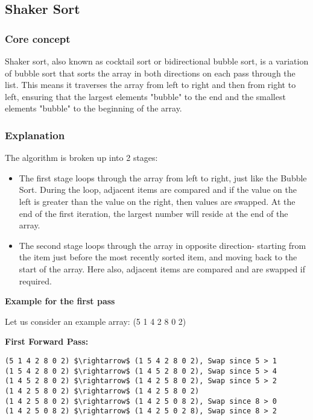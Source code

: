 \subsection{Shaker Sort}

\subsubsection{Core concept}
Shaker sort, also known as cocktail sort or bidirectional bubble sort, is a variation of bubble sort that sorts the array in both directions on each pass through the list. This means it traverses the array from left to right and then from right to left, ensuring that the largest elements "bubble" to the end and the smallest elements "bubble" to the beginning of the array.

\subsubsection{Explanation}

The algorithm is broken up into 2 stages: ~\cite{ref12}
\begin{itemize}[label=-]
    \item The first stage loops through the array from left to right, just like the Bubble Sort. During the loop, adjacent items are compared and if the value on the left is greater than the value on the right, then values are swapped. At the end of the first iteration, the largest number will reside at the end of the array.
    \item The second stage loops through the array in opposite direction- starting from the item just before the most recently sorted item, and moving back to the start of the array. Here also, adjacent items are compared and are swapped if required.
\end{itemize}

\vspace{5pt}

\textbf{Example for the first pass} ~\cite{ref12}

Let us consider an example array: (5 1 4 2 8 0 2)

\textbf{First Forward Pass:}

\begin{lstlisting}[mathescape=true]
(5 1 4 2 8 0 2) $\rightarrow$ (1 5 4 2 8 0 2), Swap since 5 > 1
(1 5 4 2 8 0 2) $\rightarrow$ (1 4 5 2 8 0 2), Swap since 5 > 4
(1 4 5 2 8 0 2) $\rightarrow$ (1 4 2 5 8 0 2), Swap since 5 > 2
(1 4 2 5 8 0 2) $\rightarrow$ (1 4 2 5 8 0 2)
(1 4 2 5 8 0 2) $\rightarrow$ (1 4 2 5 0 8 2), Swap since 8 > 0
(1 4 2 5 0 8 2) $\rightarrow$ (1 4 2 5 0 2 8), Swap since 8 > 2
\end{lstlisting}

